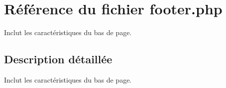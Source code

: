 \hypertarget{footer_8php}{}\section{Référence du fichier footer.\+php}
\label{footer_8php}


Inclut les caractéristiques du bas de page.  




\subsection{Description détaillée}
Inclut les caractéristiques du bas de page. 

